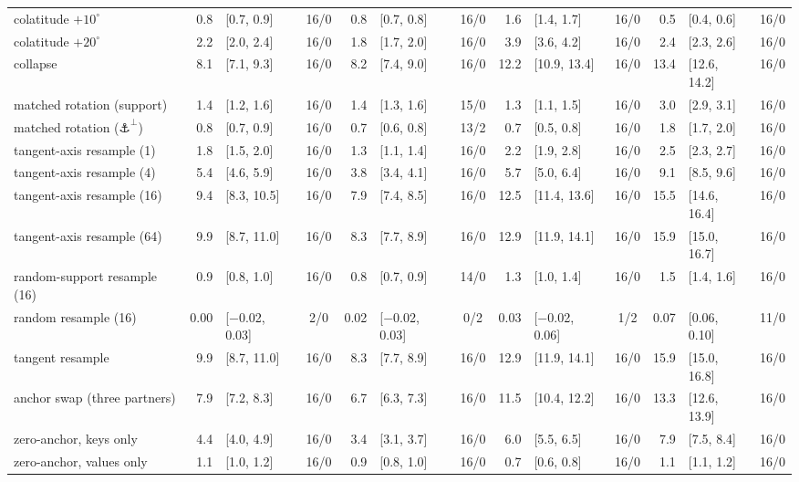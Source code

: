 \begin{table}[!ht]
\begin{adjustwidth}{-2.25in}{0in}
\begin{tabular}{@{}>{\raggedright\arraybackslash}p{1.4in}r@{\hspace{3pt}}l@{\hspace{5pt}}cr@{\hspace{3pt}}l@{\hspace{5pt}}cr@{\hspace{3pt}}l@{\hspace{5pt}}cr@{\hspace{3pt}}l@{\hspace{5pt}}c@{}}
colatitude $+10^\circ$ & 0.8 & [0.7, 0.9] & 16/0 & 0.8 & [0.7, 0.8] & 16/0 & 1.6 & [1.4, 1.7] & 16/0 & 0.5 & [0.4, 0.6] & 16/0 \\
colatitude $+20^\circ$ & 2.2 & [2.0, 2.4] & 16/0 & 1.8 & [1.7, 2.0] & 16/0 & 3.9 & [3.6, 4.2] & 16/0 & 2.4 & [2.3, 2.6] & 16/0 \\
collapse & 8.1 & [7.1, 9.3] & 16/0 & 8.2 & [7.4, 9.0] & 16/0 & 12.2 & [10.9, 13.4] & 16/0 & 13.4 & [12.6, 14.2] & 16/0 \\
matched rotation (support) & 1.4 & [1.2, 1.6] & 16/0 & 1.4 & [1.3, 1.6] & 15/0 & 1.3 & [1.1, 1.5] & 16/0 & 3.0 & [2.9, 3.1] & 16/0 \\
matched rotation ($\anchor^{\perp}$) & 0.8 & [0.7, 0.9] & 16/0 & 0.7 & [0.6, 0.8] & 13/2 & 0.7 & [0.5, 0.8] & 16/0 & 1.8 & [1.7, 2.0] & 16/0 \\
tangent-axis resample (1) & 1.8 & [1.5, 2.0] & 16/0 & 1.3 & [1.1, 1.4] & 16/0 & 2.2 & [1.9, 2.8] & 16/0 & 2.5 & [2.3, 2.7] & 16/0 \\
tangent-axis resample (4) & 5.4 & [4.6, 5.9] & 16/0 & 3.8 & [3.4, 4.1] & 16/0 & 5.7 & [5.0, 6.4] & 16/0 & 9.1 & [8.5, 9.6] & 16/0 \\
tangent-axis resample (16) & 9.4 & [8.3, 10.5] & 16/0 & 7.9 & [7.4, 8.5] & 16/0 & 12.5 & [11.4, 13.6] & 16/0 & 15.5 & [14.6, 16.4] & 16/0 \\
tangent-axis resample (64) & 9.9 & [8.7, 11.0] & 16/0 & 8.3 & [7.7, 8.9] & 16/0 & 12.9 & [11.9, 14.1] & 16/0 & 15.9 & [15.0, 16.7] & 16/0 \\
random-support resample (16) & 0.9 & [0.8, 1.0] & 16/0 & 0.8 & [0.7, 0.9] & 14/0 & 1.3 & [1.0, 1.4] & 16/0 & 1.5 & [1.4, 1.6] & 16/0 \\
random resample (16) & 0.00 & [$-$0.02, 0.03] & 2/0 & 0.02 & [$-$0.02, 0.03] & 0/2 & 0.03 & [$-$0.02, 0.06] & 1/2 & 0.07 & [0.06, 0.10] & 11/0 \\
tangent resample & 9.9 & [8.7, 11.0] & 16/0 & 8.3 & [7.7, 8.9] & 16/0 & 12.9 & [11.9, 14.1] & 16/0 & 15.9 & [15.0, 16.8] & 16/0 \\
anchor swap (three partners) & 7.9 & [7.2, 8.3] & 16/0 & 6.7 & [6.3, 7.3] & 16/0 & 11.5 & [10.4, 12.2] & 16/0 & 13.3 & [12.6, 13.9] & 16/0 \\
zero-anchor, keys only & 4.4 & [4.0, 4.9] & 16/0 & 3.4 & [3.1, 3.7] & 16/0 & 6.0 & [5.5, 6.5] & 16/0 & 7.9 & [7.5, 8.4] & 16/0 \\
zero-anchor, values only & 1.1 & [1.0, 1.2] & 16/0 & 0.9 & [0.8, 1.0] & 16/0 & 0.7 & [0.6, 0.8] & 16/0 & 1.1 & [1.1, 1.2] & 16/0 \\

\end{tabular}
\end{adjustwidth}
\end{table}
